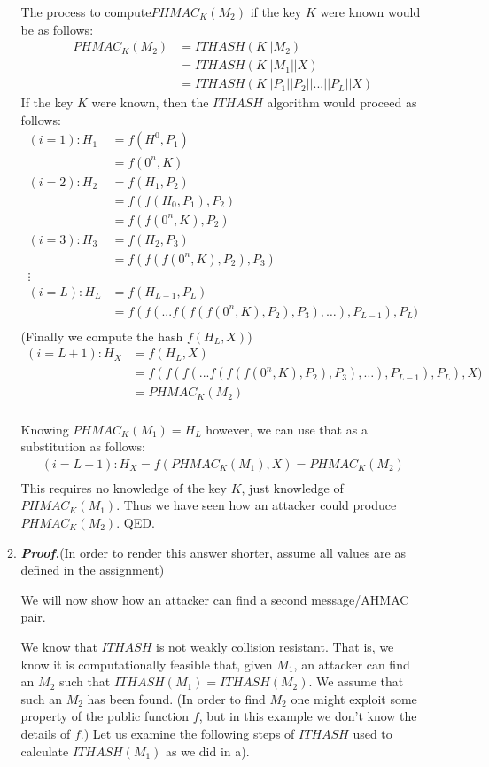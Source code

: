 \documentclass[11pt]{article}
\theoremstyle{definition}
\begin{document}
\begin{enumerate}
\begin{enumerate}
The process to compute$PHMAC_K(M_2)$ if the key $K$ were known would be as follows:
\begin{align*}
PHMAC_K(M_2) &= ITHASH(K||M_2) \\
&= ITHASH(K||M_1||X) \\
&= ITHASH(K||P_1||P_2||...||P_L||X)
\end{align*}
If the key $K$ were known, then the $ITHASH$ algorithm would proceed as follows:
\begin{align*}
(i = 1): H_1 &= f(H^0, P_1) \\
&= f(0^n, K)\\
(i = 2): H_2 &= f(H_1, P_2)\\
&= f(f(H_0, P_1), P_2) \\
&= f(f(0^n, K), P_2)\\
(i = 3): H_3 &= f(H_2, P_3)\\
&= f(f(f(0^n, K), P_2), P_3)\\
\vdots \\
(i = L): H_L &= f(H_{L-1}, P_L)\\
&= f(f(...f(f(f(0^n, K), P_2), P_3), …), P_{L-1}), P_L)\\
\end{align*}
(Finally we compute the hash $f(H_L, X)$)
\begin{align*}
(i = L + 1): H_X &= f(H_L, X) \\
&= f(f(f(...f(f(f(0^n, K), P_2), P_3), …), P_{L-1}), P_L), X) \\
&= PHMAC_K(M_2)\\
\end{align*}

Knowing $PHMAC_K(M_1) = H_L$ however, we can use that as a substitution as follows:
\begin{align*}
(i = L + 1): H_X = f(PHMAC_K(M_1), X) = PHMAC_K(M_2)\\
\end{align*}
This requires no knowledge of the key $K$, just knowledge of $PHMAC_K(M_1)$. Thus we have seen how an attacker could produce $PHMAC_K(M_2)$. 
QED. 

\item %
\textbf{\emph{Proof.}}(In order to render this answer shorter, assume all values are as defined in the assignment)

We will now show how an attacker can find a second message/AHMAC pair.

We know that $ITHASH$ is not weakly collision resistant. That is, we know it is computationally feasible that, given $M_1$, an attacker can find an $M_2$ such that $ITHASH(M_1) = ITHASH(M_2)$. We assume that such an $M_2$ has been found. (In order to find $M_2$ one might exploit some property of the public function $f$, but in this example we don’t know the details of $f$.) Let us examine the following steps of $ITHASH$ used to calculate $ITHASH(M_1)$ as we did in a).


\end{enumerate}
\end{enumerate}
\end{document}
